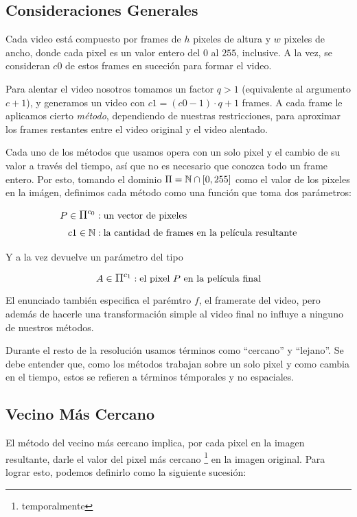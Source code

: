 \subsection{Consideraciones Generales}

Cada video est\'a compuesto por frames de $h$ pixeles de altura y $w$ pixeles de
ancho, donde cada pixel es un valor entero del $0$ al $255$, inclusive. A la
vez, se consideran $c0$ de estos frames en suceci\'on para formar el video.

Para alentar el video nosotros tomamos un factor $q > 1$ (equivalente al
argumento $c + 1$), y generamos un video con $c1 = (c0 - 1) \cdot q + 1$ frames. A cada frame
le aplicamos cierto \textit{m\'etodo}, dependiendo de nuestras restricciones,
para aproximar los frames restantes entre el video original y el video alentado.

Cada uno de los m\'etodos que usamos opera con un solo pixel y el cambio de su
valor a trav\'es del tiempo, as\'i que no es necesario que conozca todo un frame
entero. Por esto, tomando el dominio $\mathlarger{\Pi} = \mathbb{N} \cap \left[ 0, 255
\right]$ como el valor de los pixeles en la im\'agen, definimos cada m\'etodo
como una funci\'on que toma dos par\'ametros:

\[
\begin{split}
P \in \mathlarger{\Pi^{c_0}} & : \text{un vector de pixeles} \\
c1 \in \mathbb{N} & : \text{la cantidad de frames en la pel\'icula resultante}
\end{split}
\]

Y a la vez devuelve un par\'ametro del tipo

\[
A \in \mathlarger{\Pi^{c_1}} : \text{el pixel $P$ en la pel\'icula final}
\]

El enunciado tambi\'en especifica el par\'emtro $f$, el framerate del video,
pero adem\'as de hacerle una transformaci\'on simple al video final no influye a
ninguno de nuestros m\'etodos.

Durante el resto de la resoluci\'on usamos t\'erminos como ``cercano'' y
``lejano''. Se debe entender que, como los m\'etodos trabajan sobre un solo
pixel y como cambia en el tiempo, estos se refieren a t\'erminos t\'emporales y
no espaciales.

\subsection{Vecino M\'as Cercano}

El m\'etodo del vecino m\'as cercano implica, por cada pixel en la imagen
resultante, darle el valor del pixel m\'as cercano \footnote{temporalmente} en
la imagen original. Para lograr esto, podemos definirlo como la siguiente
sucesi\'on:

